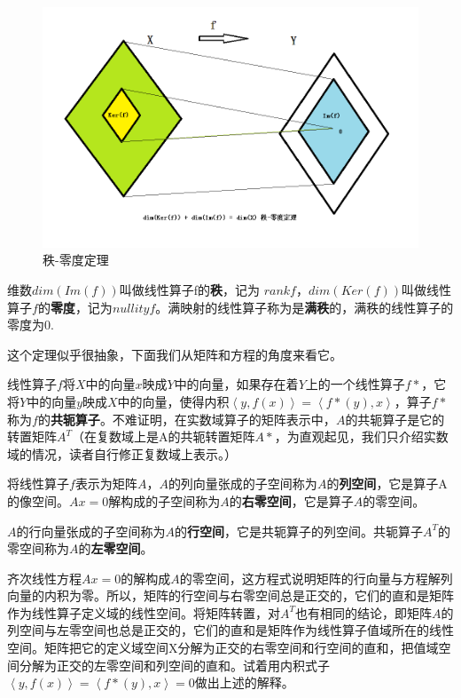 	\begin{figure}[h]
		\centering
		\includegraphics[width=0.7\linewidth]{pic/160449rx8lvzcxlgan88va.png}
		\caption{秩-零度定理}
		\label{fig:160449rx8lvzcxlgan88va}
	\end{figure}
	
	
	维数$  dim(Im(f))  $叫做线性算子f的\textbf{秩}，记为 $ rank f $，$ dim(Ker(f)) $叫做线性算子$ f $的\textbf{零度}，记为$ nullity f $。满映射的线性算子称为是\textbf{满秩}的，满秩的线性算子的零度为0. 
	
	这个定理似乎很抽象，下面我们从矩阵和方程的角度来看它。
	
	线性算子$ f $将$ X $中的向量$ x $映成$ Y $中的向量，如果存在着$ Y $上的一个线性算子$ f* $，它将$ Y $中的向量$ y $映成$ X $中的向量，使得内积$ \left\langle y, f(x)\right\rangle = \left\langle f*(y), x\right\rangle $，算子$ f* $称为$ f $的\textbf{共轭算子}。不难证明，在实数域算子的矩阵表示中，$ A $的共轭算子是它的转置矩阵$ A^T $（在复数域上是A的共轭转置矩阵$ A* $，为直观起见，我们只介绍实数域的情况，读者自行修正复数域上表示。）
	
	将线性算子$ f $表示为矩阵$ A $，$ A $的列向量张成的子空间称为$ A $的\textbf{列空间}，它是算子A的像空间。$ Ax=0 $解构成的子空间称为$ A $的\textbf{右零空间}，它是算子$ A $的零空间。
	
	$ A $的行向量张成的子空间称为$ A $的\textbf{行空间}，它是共轭算子的列空间。共轭算子$ A^T $的零空间称为$ A $的\textbf{左零空间}。	
	
	齐次线性方程$ Ax=0 $的解构成$ A $的零空间，这方程式说明矩阵的行向量与方程解列向量的内积为零。所以，矩阵的行空间与右零空间总是正交的，它们的直和是矩阵作为线性算子定义域的线性空间。将矩阵转置，对$ A^T $也有相同的结论，即矩阵$ A $的列空间与左零空间也总是正交的，它们的直和是矩阵作为线性算子值域所在的线性空间。矩阵把它的定义域空间X分解为正交的右零空间和行空间的直和，把值域空间分解为正交的左零空间和列空间的直和。试着用内积式子$ \left\langle y, f(x)\right\rangle = \left\langle f*(y), x\right\rangle = 0 $做出上述的解释。
	
